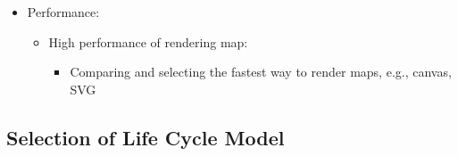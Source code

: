 \begin{itemize}
  \item Performance:
  \begin{itemize}
    \item High performance of rendering map:
    \begin{itemize}
      \item Comparing and selecting the fastest way to render maps, e.g., canvas, SVG
    \end{itemize}
  \end{itemize}
\end{itemize}

\subsection{Selection of Life Cycle Model}
